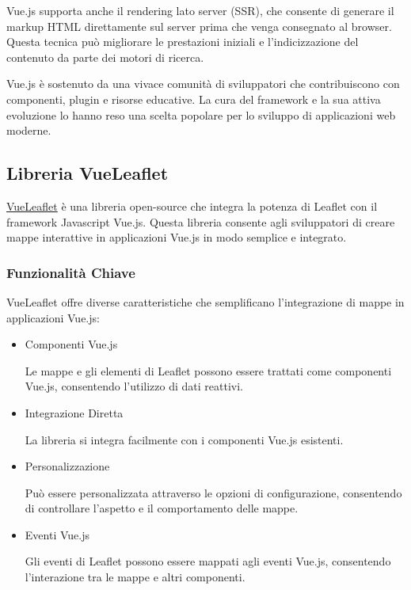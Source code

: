 Vue.js supporta anche il rendering lato server (SSR), che consente di generare il markup HTML direttamente sul server prima che venga consegnato al browser. Questa tecnica può migliorare le prestazioni iniziali e l'indicizzazione del contenuto da parte dei motori di ricerca.

Vue.js è sostenuto da una vivace comunità di sviluppatori che contribuiscono con componenti, plugin e risorse educative. La cura del framework e la sua attiva evoluzione lo hanno reso una scelta popolare per lo sviluppo di applicazioni web moderne.


\subsection{Libreria VueLeaflet}
\href{https://github.com/vue-leaflet/vue-leaflet}{VueLeaflet} è una libreria open-source che integra la potenza di Leaflet con il framework Javascript Vue.js. Questa libreria consente agli sviluppatori di creare mappe interattive in applicazioni Vue.js in modo semplice e integrato.

\subsubsection{Funzionalità Chiave}
VueLeaflet offre diverse caratteristiche che semplificano l'integrazione di mappe in applicazioni Vue.js:

\begin{itemize}
    \item Componenti Vue.js
    
    Le mappe e gli elementi di Leaflet possono essere trattati come componenti Vue.js, consentendo l'utilizzo di dati reattivi.

    \item Integrazione Diretta
    
    La libreria si integra facilmente con i componenti Vue.js esistenti.

    \item Personalizzazione
    
    Può essere personalizzata attraverso le opzioni di configurazione, consentendo di controllare l'aspetto e il comportamento delle mappe.

    \item Eventi Vue.js
    
    Gli eventi di Leaflet possono essere mappati agli eventi Vue.js, consentendo l'interazione tra le mappe e altri componenti.
\end{itemize}


